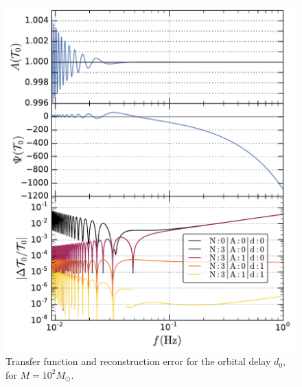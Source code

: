 \documentclass[aps,showpacs,twocolumn,
prd,superscriptaddress,nofootinbib]{revtex4-1}
\newcommand{\Msol}{M_{\odot}}
\begin{document}
\begin{figure}
  \centering
  \includegraphics[width=.98\linewidth]{plots/LISAtransfererrorM1e2dO_py.pdf}
  \caption{Transfer function and reconstruction error for the orbital delay $d_{0}$, for $M=10^{2} \Msol$.}
  \label{fig:LISAerrorM1e2orb}
\end{figure}
\end{document}
